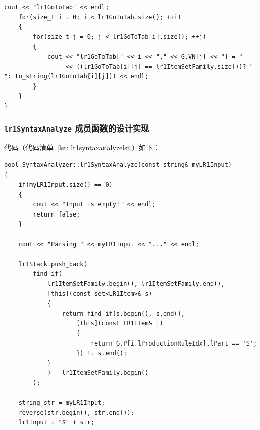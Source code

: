 \documentclass{article}
\begin{document}
\begin{CJK*}{UTF8}{gbsn}
\begin{center}
\begin{lstlisting}[caption = {\texttt{buildLR1ParseTab} 成员函数代码清单}, label = {lst: buildlr1parsetablst}]
	cout << "lr1GoToTab" << endl;
	for(size_t i = 0; i < lr1GoToTab.size(); ++i)
	{
		for(size_t j = 0; j < lr1GoToTab[i].size(); ++j)
		{
			cout << "lr1GoToTab[" << i << "," << G.VN[j] << "] = "
			     << ((lr1GoToTab[i][j] == lr1ItemSetFamily.size())? " ": to_string(lr1GoToTab[i][j])) << endl;
		}
	}
}
\end{lstlisting}
\end{center}

\subsubsection{\texttt{lr1SyntaxAnalyze} 成员函数的设计实现}
代码（代码清单~\ref{lst: lr1syntaxanalyzelst}）如下：
\begin{center}
\begin{lstlisting}[caption = {\texttt{lr1SyntaxAnalyze} 成员函数代码清单}, label = {lst: lr1syntaxanalyzelst}]
bool SyntaxAnalyzer::lr1SyntaxAnalyze(const string& myLR1Input)
{
	if(myLR1Input.size() == 0)
	{
		cout << "Input is empty!" << endl;
		return false;
	}

	cout << "Parsing " << myLR1Input << "..." << endl;

	lr1Stack.push_back(
		find_if(
			lr1ItemSetFamily.begin(), lr1ItemSetFamily.end(),
			[this](const set<LR1Item>& s)
			{
				return find_if(s.begin(), s.end(),
					[this](const LR1Item& i)
					{
						return G.P[i.lProductionRuleIdx].lPart == 'S';
					}) != s.end();
			}
			) - lr1ItemSetFamily.begin()
		);

	string str = myLR1Input;
	reverse(str.begin(), str.end());
	lr1Input = "$" + str;


\end{lstlisting}
\end{center}
\end{CJK*}
\end{document}
